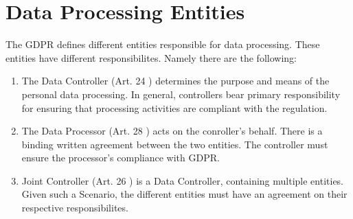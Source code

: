 \documentclass[a4paper,12pt]{report}
\begin{document}
	\section{Data Processing Entities}
	\startsection
	The GDPR defines different entities responsible for data processing. These entities have different responsibilites.
	Namely there are the following:
	\begin{enumerate}[]
		\item The Data Controller (Art. 24 \cite{EUdataregulations2018})
		determines the purpose and means of the personal data processing.
		In general, controllers bear primary responsibility for ensuring that processing activities are compliant with the regulation.
		\item The Data Processor (Art. 28 \cite{EUdataregulations2018})
		acts on the conroller's behalf. 
		There is a binding written agreement between the two entities. 
		The controller must ensure the processor's compliance with GDPR.
		\item Joint Controller (Art. 26 \cite{EUdataregulations2018}) is a Data Controller, containing multiple entities.
		Given such a Scenario, the different entities must have an agreement on their respective responsibilites.
	\end{enumerate}
	\closesection
\end{document}
